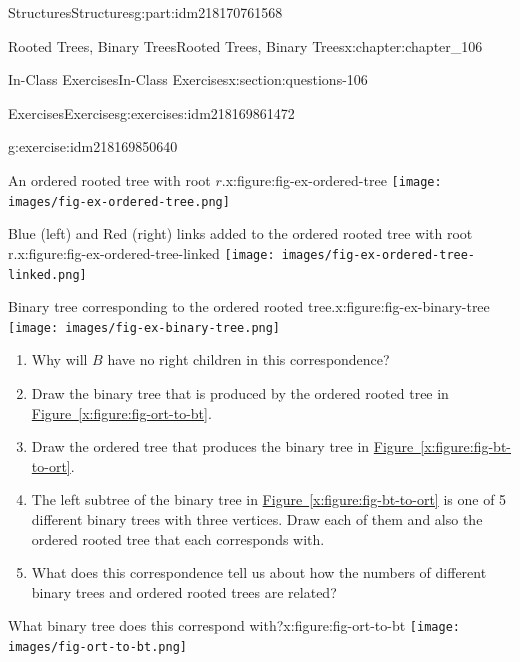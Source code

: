 \documentclass[oneside,10pt,]{book}
\newcommand{\xreffont}{\relax}
\numberwithin{equation}{section}
\begin{document}
\begin{partptx}{Structures}{}{Structures}{}{}{g:part:idm218170761568}
\begin{chapterptx}{Rooted Trees, Binary Trees}{}{Rooted Trees, Binary Trees}{}{}{x:chapter:chapter_106}
\begin{sectionptx}{In-Class Exercises}{}{In-Class Exercises}{}{}{x:section:questions-106}
\begin{exercises-subsection-numberless}{Exercises}{}{Exercises}{}{}{g:exercises:idm218169861472}
\begin{exercisegroup}
\begin{divisionexerciseeg}{5}{}{}{g:exercise:idm218169850640}
\begin{sidebyside}{2}{0}{0}{0}
\begin{sbspanel}{0.5}
\begin{figureptx}{An ordered rooted tree with root \(r\).}{x:figure:fig-ex-ordered-tree}{}
\texttt{[image: images/fig-ex-ordered-tree.png]}
\tcblower
\end{figureptx}%
\end{sbspanel}%
\end{sidebyside}%
\begin{sidebyside}{2}{0}{0}{0}%
\begin{sbspanel}{0.5}%
\begin{figureptx}{Blue (left) and Red (right) links added to the ordered rooted tree with root r.}{x:figure:fig-ex-ordered-tree-linked}{}%
\texttt{[image: images/fig-ex-ordered-tree-linked.png]}
\tcblower
\end{figureptx}%
\end{sbspanel}%
\begin{sbspanel}{0.5}%
\begin{figureptx}{Binary tree corresponding to the ordered rooted tree.}{x:figure:fig-ex-binary-tree}{}%
\texttt{[image: images/fig-ex-binary-tree.png]}
\tcblower
\end{figureptx}%
\end{sbspanel}%
\end{sidebyside}%
\par
%
\begin{enumerate}[label=(\alph*)]
\item{}Why will \(B\) have no right children in this correspondence?%
\item{}Draw the binary tree that is produced by the ordered rooted tree in \hyperref[x:figure:fig-ort-to-bt]{Figure~{\xreffont\ref{x:figure:fig-ort-to-bt}}}.%
\item{}Draw the ordered tree that produces the binary tree in \hyperref[x:figure:fig-bt-to-ort]{Figure~{\xreffont\ref{x:figure:fig-bt-to-ort}}}.%
\item{}The left subtree of the binary tree in \hyperref[x:figure:fig-bt-to-ort]{Figure~{\xreffont\ref{x:figure:fig-bt-to-ort}}} is one of 5 different binary trees with three vertices.  Draw each of them and also the ordered rooted tree that each corresponds with.%
\item{}What does this correspondence tell us about how the numbers of different binary trees and ordered rooted trees are related?%
\end{enumerate}
%
\begin{sidebyside}{2}{0}{0}{0}%
\begin{sbspanel}{0.5}%
\begin{figureptx}{What binary tree does this correspond with?}{x:figure:fig-ort-to-bt}{}%
\texttt{[image: images/fig-ort-to-bt.png]}

\end{figureptx}
\end{sbspanel}
\end{sidebyside}
\end{divisionexerciseeg}
\end{exercisegroup}
\end{exercises-subsection-numberless}
\end{sectionptx}
\end{chapterptx}
\end{partptx}
\end{document}
